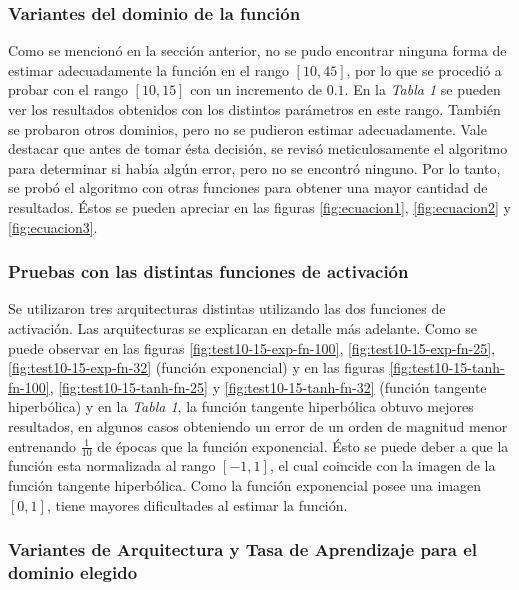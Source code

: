 \documentclass[12pt,a4paper]{article}
\begin{document}
\subsubsection{Variantes del dominio de la función}

Como se mencionó en la sección anterior, no se pudo encontrar ninguna forma de estimar adecuadamente la función en el rango $[10,45]$, por lo que se procedió a probar con el rango $[10, 15]$ con un incremento de $0.1$. En la \emph{Tabla 1} se pueden ver los resultados obtenidos con los distintos parámetros en este rango. También se probaron otros dominios, pero no se pudieron estimar adecuadamente. Vale destacar que antes de tomar ésta decisión, se revisó meticulosamente el algoritmo para determinar si había algún error, pero no se encontró ninguno. Por lo tanto, se probó el algoritmo con otras funciones para obtener una mayor cantidad de resultados. Éstos se pueden apreciar en las figuras \ref{fig:ecuacion1}, \ref{fig:ecuacion2} y \ref{fig:ecuacion3}.

\subsubsection{Pruebas con las distintas funciones de activación}

Se utilizaron tres arquitecturas distintas utilizando las dos funciones de activación. Las arquitecturas se explicaran en detalle más adelante. Como se puede observar en las figuras \ref{fig:test10-15-exp-fn-100}, \ref{fig:test10-15-exp-fn-25}, \ref{fig:test10-15-exp-fn-32} (función exponencial) y en las figuras \ref{fig:test10-15-tanh-fn-100}, \ref{fig:test10-15-tanh-fn-25} y \ref{fig:test10-15-tanh-fn-32} (función tangente hiperbólica) y en la \emph{Tabla 1}, la función tangente hiperbólica obtuvo mejores resultados, en algunos casos obteniendo un error de un orden de magnitud menor entrenando $\frac{1}{10}$ de épocas que la función exponencial. Ésto se puede deber a que la función esta normalizada al rango $[-1, 1]$, el cual coincide con la imagen de la función tangente hiperbólica. Como la función exponencial posee una imagen $[0,1]$, tiene mayores dificultades al estimar la función.

\subsubsection{Variantes de Arquitectura y Tasa de Aprendizaje para el dominio elegido}
\end{document}
